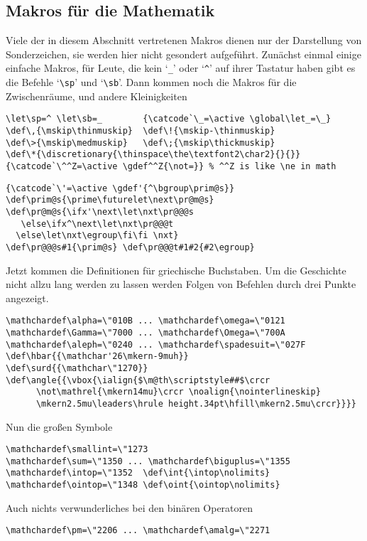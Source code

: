 \begin{appendix}
\subsection{Makros f\"ur die Mathematik}
Viele der in diesem Abschnitt vertretenen Makros dienen nur der
Darstellung von Sonderzeichen, sie werden hier nicht gesondert
aufgef\"uhrt. Zun\"achst einmal einige einfache Makros, f\"ur Leute, die
kein `\verb|_|' oder `\verb|^|' auf ihrer Tastatur haben gibt es die
Befehle `\verb|\sp|' und `\verb|\sb|'. Dann kommen noch die Makros f\"ur
die Zwischenr\"aume, und andere Kleinigkeiten
\begin{verbatim}
\let\sp=^ \let\sb=_        {\catcode`\_=\active \global\let_=\_}
\def\,{\mskip\thinmuskip}  \def\!{\mskip-\thinmuskip}
\def\>{\mskip\medmuskip}   \def\;{\mskip\thickmuskip}
\def\*{\discretionary{\thinspace\the\textfont2\char2}{}{}}
{\catcode`\^^Z=\active \gdef^^Z{\not=}} % ^^Z is like \ne in math
\end{verbatim}
\begin{verbatim}
{\catcode`\'=\active \gdef'{^\bgroup\prim@s}}
\def\prim@s{\prime\futurelet\next\pr@m@s}
\def\pr@m@s{\ifx'\next\let\nxt\pr@@@s
   \else\ifx^\next\let\nxt\pr@@@t
  \else\let\nxt\egroup\fi\fi \nxt}
\def\pr@@@s#1{\prim@s} \def\pr@@@t#1#2{#2\egroup}
\end{verbatim}
Jetzt kommen die Definitionen f\"ur griechische Buchstaben. Um die
Geschichte nicht allzu lang werden zu lassen werden Folgen von
Befehlen durch drei Punkte angezeigt.
\begin{verbatim}
\mathchardef\alpha=\"010B ... \mathchardef\omega=\"0121
\mathchardef\Gamma=\"7000 ... \mathchardef\Omega=\"700A
\mathchardef\aleph=\"0240 ... \mathchardef\spadesuit=\"027F
\def\hbar{{\mathchar'26\mkern-9muh}}
\def\surd{{\mathchar\"1270}}
\def\angle{{\vbox{\ialign{$\m@th\scriptstyle##$\crcr
      \not\mathrel{\mkern14mu}\crcr \noalign{\nointerlineskip}
      \mkern2.5mu\leaders\hrule height.34pt\hfill\mkern2.5mu\crcr}}}}
\end{verbatim}
Nun die gro\ss{}en Symbole
\begin{verbatim}
\mathchardef\smallint=\"1273
\mathchardef\sum=\"1350 ... \mathchardef\biguplus=\"1355
\mathchardef\intop=\"1352  \def\int{\intop\nolimits}
\mathchardef\ointop=\"1348 \def\oint{\ointop\nolimits}
\end{verbatim}
Auch nichts verwunderliches bei den bin\"aren Operatoren
\begin{verbatim}
\mathchardef\pm=\"2206 ... \mathchardef\amalg=\"2271
\end{verbatim}

\end{appendix}
